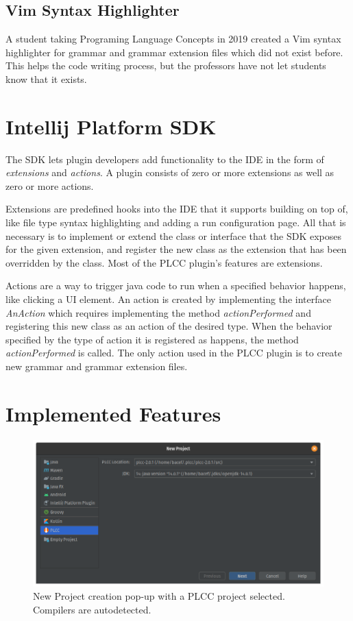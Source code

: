 \documentclass[conference, letterpaper]{IEEEtran}
\begin{document}
\subsection{Vim Syntax Highlighter}\label{subsec:vim-highlighter-attempt}
A student taking Programing Language Concepts in 2019 created a Vim syntax highlighter for grammar and grammar extension files which did not exist before.
This helps the code writing process, but the professors have not let students know that it exists.


\section{Intellij Platform SDK}\label{sec:intellij-platform-sdk}
The SDK lets plugin developers add functionality to the IDE in the form of \textit{extensions} and \textit{actions}.
A plugin consists of zero or more extensions as well as zero or more actions.

Extensions are predefined hooks into the IDE that it supports building on top of, like file type syntax highlighting and adding a run configuration page.
All that is necessary is to implement or extend the class or interface that the SDK exposes for the given extension, and register the new class as the extension that has been overridden by the class.
Most of the PLCC plugin's features are extensions.

Actions are a way to trigger java code to run when a specified behavior happens, like clicking a UI element.
An action is created by implementing the interface \textit{AnAction} which requires implementing the method \textit{actionPerformed} and registering this new class as an action of the desired type.
When the behavior specified by the type of action it is registered as happens, the method \textit{actionPerformed} is called.
The only action used in the PLCC plugin is to create new grammar and grammar extension files.


\section{Implemented Features}\label{sec:implemented-features}
\begin{figure}[!t]
    \centering
    \includegraphics[width=6in]{proj_config.png}
    \caption{New Project creation pop-up with a PLCC project selected. Compilers are autodetected.}
    \label{fig:proj_config}
\end{figure}
\end{document}
